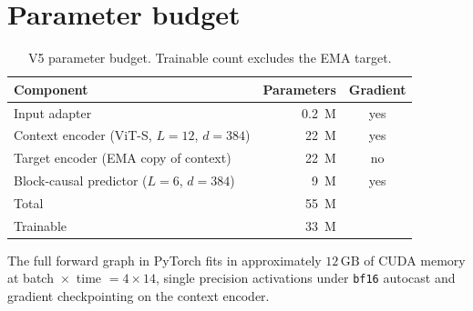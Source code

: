 \section{Parameter budget}
\label{sec:arch-scale}

\begin{table}[htbp]
\centering\small
\begin{tabular}{l r c}
\toprule
Component & Parameters & Gradient \\
\midrule
Input adapter            & \phantom{0}0.2~M & yes \\
Context encoder (ViT-S, $L{=}12$, $d{=}384$) & 22~M  & yes \\
Target encoder (EMA copy of context) & 22~M  & no  \\
Block-causal predictor ($L{=}6$, $d{=}384$)  & \phantom{0}9~M  & yes \\
\midrule
Total                                         & 55~M  &     \\
Trainable                                     & 33~M  &     \\
\bottomrule
\end{tabular}
\caption{V5 parameter budget. Trainable count excludes the EMA target.}
\label{tab:scale}
\end{table}

\noindent The full forward graph in PyTorch fits in
approximately $12\,\mathrm{GB}$ of CUDA memory at batch~$\times$~time
$= 4 \times 14$, single precision activations under
\texttt{bf16} autocast and gradient checkpointing on the context
encoder.
